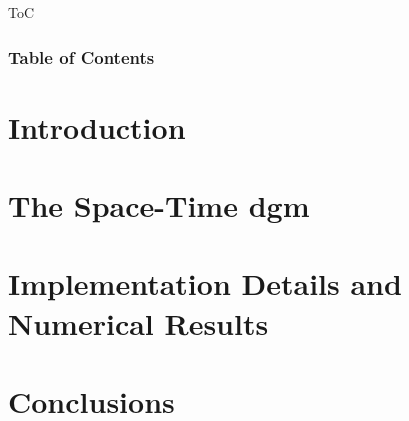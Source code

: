 
\begin{frame}{ToC}
    \frametitle{Table of Contents}

    \vspace*{\fill}
    \tableofcontents[hideallsubsections]
    \vspace*{\fill}
\end{frame}



\section{Introduction}




\section{The Space-Time \texorpdfstring{\acrlong{dgm}}{}}




\section{Implementation Details and Numerical Results}




\section{Conclusions}

